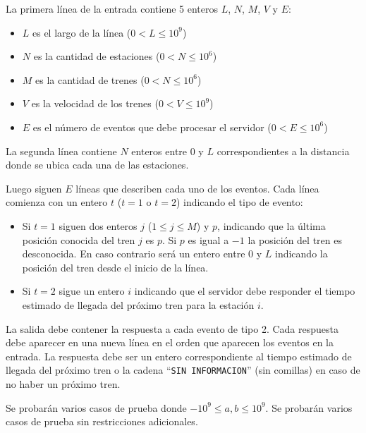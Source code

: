 \documentclass{oci}
\begin{document}
\begin{inputDescription}
  La primera línea de la entrada contiene 5 enteros $L$, $N$, $M$, $V$ y $E$:
  \begin{itemize}
    \item $L$ es el largo de la línea ($0 < L \leq 10^9$)
    \item $N$ es la cantidad de estaciones ($0 < N \leq 10^6$)
    \item $M$ es la cantidad de trenes ($0 < N \leq 10^6$)
    \item $V$ es la velocidad de los trenes ($0 < V \leq 10^9$)
    \item $E$ es el número de eventos que debe procesar el servidor ($0 < E \leq 10^6$)
  \end{itemize}
  La segunda línea contiene $N$ enteros entre 0 y $L$ correspondientes a la distancia
  donde se ubica cada una de las estaciones.

  Luego siguen $E$ líneas que describen cada uno de los eventos.
  Cada línea comienza con un entero $t$ ($t=1$ o $t=2$) indicando el tipo de evento:
  \begin{itemize}
  \item Si $t=1$ siguen dos enteros $j$ ($1\leq j \leq M$) y $p$, indicando
  que la última posición conocida del tren $j$ es $p$.
  Si $p$ es igual a $-1$ la posición del tren es desconocida.
  En caso contrario será un entero entre 0 y $L$ indicando la posición del tren
  desde el inicio de la línea.
  \item Si $t=2$ sigue un entero $i$ indicando que el servidor debe responder el tiempo
  estimado de llegada del próximo tren para la estación $i$.
  \end{itemize}
\end{inputDescription}

\begin{outputDescription}
  La salida debe contener la respuesta a cada evento de tipo 2.
  Cada respuesta debe aparecer en una nueva línea en el orden que aparecen
  los eventos en la entrada.
  La respuesta debe ser un entero correspondiente al tiempo estimado de llegada
  del próximo tren o la cadena ``\texttt{SIN INFORMACION}'' (sin comillas) en caso
  de no haber un próximo tren.
\end{outputDescription}

\begin{scoreDescription}
   Se probarán varios casos de prueba donde $-10^9\leq a, b \leq 10^9$.
   Se probarán varios casos de prueba sin restricciones adicionales.
\end{scoreDescription}

\begin{sampleDescription}
\end{sampleDescription}
\end{document}
